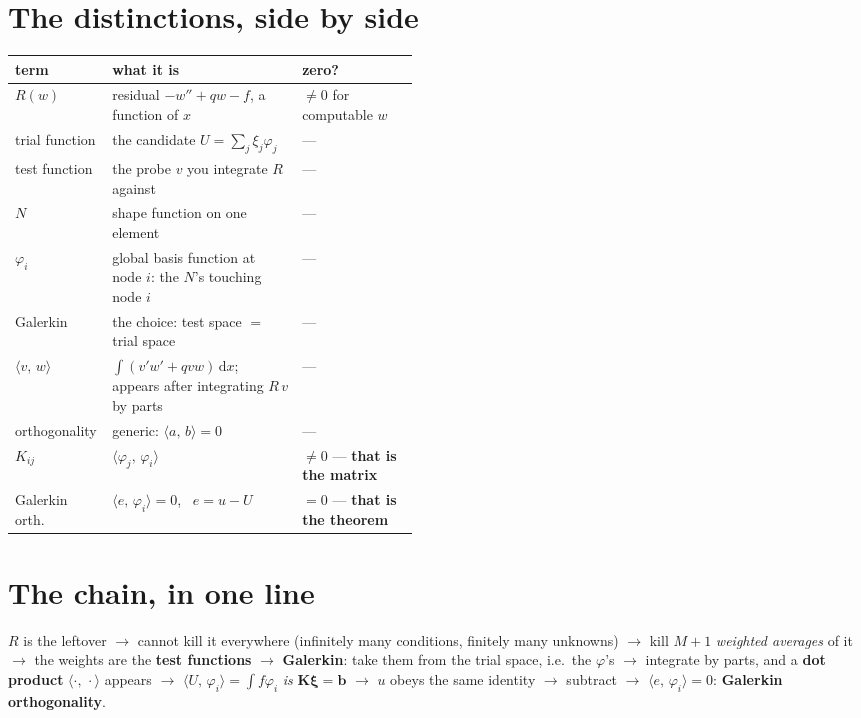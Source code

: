 \documentclass[11pt]{article}
\newcommand{\dx}{\,\mathrm{d}x}
\newcommand{\ip}[2]{\bigl\langle #1,\,#2\bigr\rangle}
\newcommand{\Kmat}{\bm{K}}
\begin{document}
\section{The distinctions, side by side}

\begin{center}\small
\renewcommand{\arraystretch}{1.3}
\begin{tabular}{@{}l>{\raggedright\arraybackslash}p{0.47\linewidth}l@{}}
\toprule
\textbf{term} & \textbf{what it is} & \textbf{zero?}\\
\midrule
$R(w)$ & residual $-w''+qw-f$, a function of $x$ & $\neq0$ for computable $w$\\
trial function & the candidate $U=\sum_j\xi_j\varphi_j$ & ---\\
test function  & the probe $v$ you integrate $R$ against & ---\\
$N$            & shape function on one element & ---\\
$\varphi_i$    & global basis function at node $i$: the $N$'s touching node $i$ & ---\\
Galerkin       & the choice: test space $=$ trial space & ---\\
$\ip{v}{w}$    & $\int(v'w'+qvw)\dx$; appears after integrating $R\,v$ by parts & ---\\
orthogonality  & generic: $\ip{a}{b}=0$ & ---\\
$K_{ij}$       & $\ip{\varphi_j}{\varphi_i}$ & $\neq0$ --- \textbf{that is the matrix}\\
Galerkin orth. & $\ip{e}{\varphi_i}=0$, \ $e=u-U$ & $=0$ --- \textbf{that is the theorem}\\
\bottomrule
\end{tabular}
\end{center}

\section{The chain, in one line}

\begin{center}
\begin{minipage}{0.94\linewidth}\small
$R$ is the leftover $\longrightarrow$ cannot kill it everywhere (infinitely many
conditions, finitely many unknowns) $\longrightarrow$ kill $M+1$ \emph{weighted
averages} of it $\longrightarrow$ the weights are the \textbf{test functions}
$\longrightarrow$ \textbf{Galerkin}: take them from the trial space, i.e.\ the
$\varphi$'s $\longrightarrow$ integrate by parts, and a \textbf{dot product}
$\ip{\cdot}{\cdot}$ appears $\longrightarrow$
$\ip{U}{\varphi_i}=\int f\varphi_i$ \emph{is} $\Kmat\bm{\xi}=\bm{b}$
$\longrightarrow$ $u$ obeys the same identity $\longrightarrow$ subtract
$\longrightarrow$ $\ip{e}{\varphi_i}=0$: \textbf{Galerkin orthogonality}.
\end{minipage}
\end{center}
\end{document}
